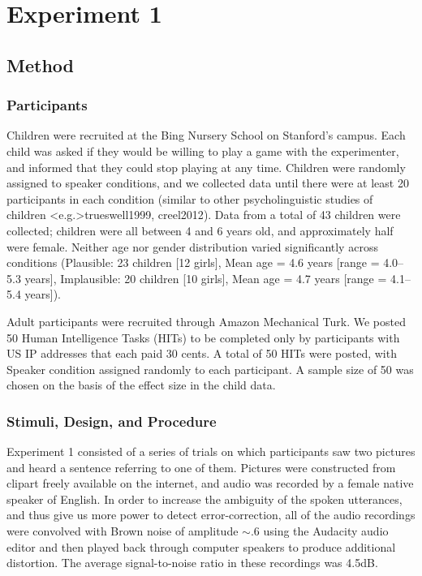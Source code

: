 \documentclass[man,floatsintext]{apa6}
\begin{document}
\section{Experiment 1}

\subsection{Method}
\subsubsection{Participants}

Children were recruited at the Bing Nursery School on Stanford's campus. Each child was asked if they would be willing to play a game with the experimenter, and informed that they could stop playing at any time. Children were randomly assigned to speaker conditions, and we collected data until there were at least 20 participants in each condition (similar to other psycholinguistic studies of children \citeNP<e.g.>{trueswell1999, creel2012}). Data from a total of 43 children were collected; children were all between 4 and 6 years old, and approximately half were female. Neither age nor gender distribution varied significantly across conditions (Plausible: 23 children [12 girls], Mean age = 4.6 years [range = 4.0--5.3 years], Implausible: 20 children [10 girls], Mean age = 4.7 years [range = 4.1--5.4 years]).

Adult participants were recruited through Amazon Mechanical Turk. We posted 50 Human Intelligence Tasks (HITs) to be completed only by participants with US IP addresses that each paid 30 cents. A total of 50 HITs were posted, with Speaker condition assigned randomly to each participant. A sample size of 50 was chosen on the basis of the effect size in the child data.

\subsubsection{Stimuli, Design, and Procedure}

Experiment 1 consisted of a series of trials on which participants saw two pictures and heard a sentence referring to one of them. Pictures were constructed from clipart freely available on the internet, and audio was recorded by a female native speaker of English. In order to increase the ambiguity of the spoken utterances, and thus give us more power to detect error-correction, all of the audio recordings were convolved with Brown noise of amplitude $\sim$.6 using the Audacity audio editor and then played back through computer speakers to produce additional distortion. The average signal-to-noise ratio in these recordings was 4.5dB.
\end{document}
